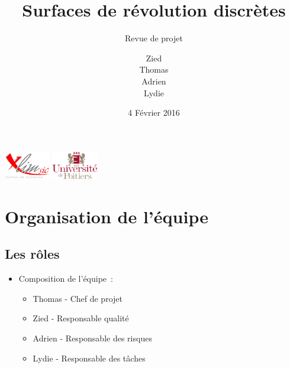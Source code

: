 \documentclass{beamer}
\title[Revue de projet]{Surfaces de r\'evolution discrètes}
\subtitle{Revue de projet}
\author[]{Zied \smallcaps{Ben} \smallcaps{Othmane} \\ Thomas \smallcaps{Benoist}
	\\ Adrien \smallcaps{Bisutti} \\ Lydie \smallcaps{Richaume}}
\institute{Universit\'e de Poitiers}
\date{4 Février 2016}
\begin{document}


\begin{frame}
	\titlepage
	\includegraphics[width=2cm]{../Images/logo-Xlim.png}
	\hfill
	\includegraphics[width=2cm]{../Images/logo_univ_poitiers.png}
\end{frame}




\section{Organisation de l'\'equipe}


	 \subsection{Les r\^oles}
	 \begin{frame}{\subsecname}
		\begin{itemize}
			\item Composition de l'\'equipe~:
				\begin{itemize}
					\item Thomas  - Chef de projet
					\item Zied   - Responsable
						qualit\'e
					\item Adrien  - Responsable des risques
					\item Lydie  - Responsable des t\^aches
				\end{itemize}
		\end{itemize}
	\end{frame}



\end{document}
